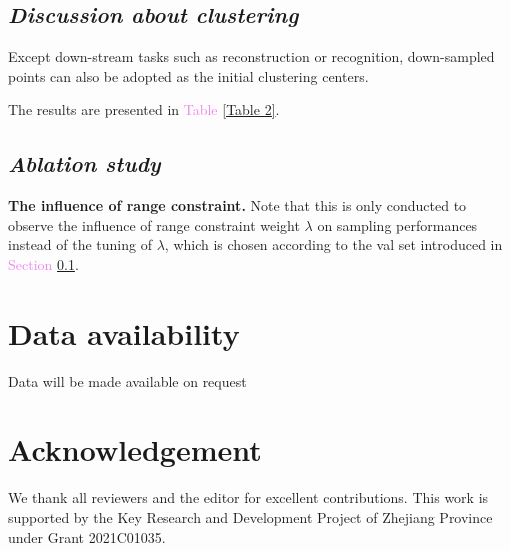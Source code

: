 \documentclass{article}
\begin{document}
\newpage
\begin{multicols}{2}
\subsection{\textit{Discussion about clustering}}\label{Section}
Except down-stream tasks such as reconstruction or recognition, down-sampled points can also be adopted as the initial clustering centers. \cite{Clustering} \par
The results are presented in \textcolor{violet}{Table} \ref{Table 2}.

\subsection{\textit{Ablation study}}
\textbf{The influence of range constraint.} Note that this is only conducted to observe the influence of range constraint weight $\lambda$ on sampling performances instead of the tuning of $\lambda$, which is chosen according to the val set
introduced in \textcolor{violet}{Section} \ref{Section}.\par


\section*{\textbf{Data availability}}
Data will be made available on request
\section*{\textbf{Acknowledgement}}
We thank all reviewers and the editor for excellent contributions. This work is supported by the Key Research and Development Project of Zhejiang Province under Grant 2021C01035.
\end{multicols}


\printbibliography
\end{document}
